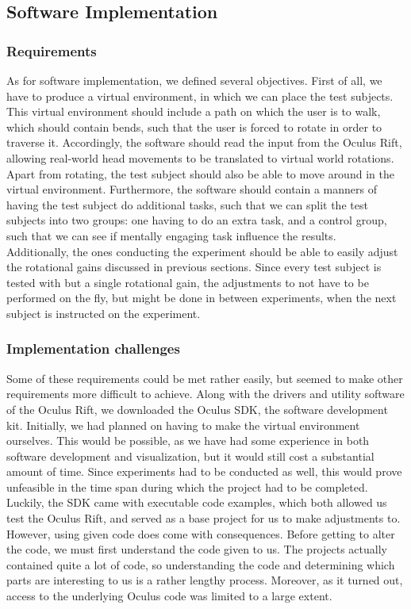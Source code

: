\subsection{Software Implementation}
\subsubsection{Requirements}
As for software implementation, we defined several objectives.
First of all, we have to produce a virtual environment, in which we can place the test subjects.
This virtual environment should include a path on which the user is to walk, which should contain bends, such that the user is forced to rotate in order to traverse it.
Accordingly, the software should read the input from the Oculus Rift, allowing real-world head movements to be translated to virtual world rotations.
Apart from rotating, the test subject should also be able to move around in the virtual environment. 
Furthermore, the software should contain a manners of having the test subject do additional tasks, such that we can split the test subjects into two groups: one having to do an extra task, and a control group, such that we can see if mentally engaging task influence the results.\\
Additionally, the ones conducting the experiment should be able to easily adjust the rotational gains discussed in previous sections.
Since every test subject is tested with but a single rotational gain, the adjustments to not have to be performed on the fly, but might be done in between experiments, when the next subject is instructed on the experiment.

\subsubsection{Implementation challenges}
Some of these requirements could be met rather easily, but seemed to make other requirements more difficult to achieve.
Along with the drivers and utility software of the Oculus Rift, we downloaded the Oculus SDK, the software development kit.
Initially, we had planned on having to make the virtual environment ourselves.
This would be possible, as we have had some experience in both software development and visualization, but it would still cost a substantial amount of time.
Since experiments had to be conducted as well, this would prove unfeasible in the time span during which the project had to be completed.
Luckily, the SDK came with executable code examples, which both allowed us test the Oculus Rift, and served as a base project for us to make adjustments to. \\
However, using given code does come with consequences.
Before getting to alter the code, we must first understand the code given to us.
The projects actually contained quite a lot of code, so understanding the code and determining which parts are interesting to us is a rather lengthy process.
Moreover, as it turned out, access to the underlying Oculus code was limited to a large extent. \\

